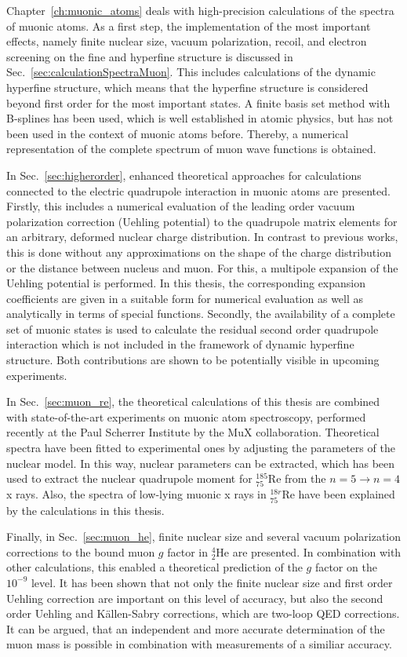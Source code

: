 Chapter~\ref{ch:muonic_atoms} deals with high-precision calculations of the spectra of muonic atoms. 
As a first step, the implementation of the most important effects, namely finite nuclear size, vacuum polarization, recoil, and electron screening on the fine and hyperfine structure is discussed in Sec.~\ref{sec:calculationSpectraMuon}.
This includes calculations of the dynamic hyperfine structure, which means that the hyperfine structure is considered beyond first order for the most important states.
A finite basis set method with B-splines has been used, which is well established in atomic physics, but has not been used in the context of muonic atoms before. Thereby, a numerical representation of the complete spectrum of muon wave functions is obtained.

In Sec.~\ref{sec:higherorder}, enhanced theoretical approaches for calculations connected to the electric quadrupole interaction in muonic atoms are presented. 
Firstly, this includes a numerical evaluation of the leading order vacuum polarization correction (Uehling potential) to the quadrupole matrix elements for an arbitrary, deformed nuclear charge distribution. In contrast to previous works, this is done without any approximations on the shape of the charge distribution or the distance between nucleus and muon. For this, a multipole expansion of the Uehling potential is performed. In this thesis, the corresponding expansion coefficients are given in a suitable form for numerical evaluation as well as analytically in terms of special functions.
Secondly, the availability of a complete set of muonic states is used to calculate the residual second order quadrupole interaction which is not included in the framework of dynamic hyperfine structure. 
Both contributions are shown to be potentially visible in upcoming experiments.

In Sec.~\ref{sec:muon_re}, the theoretical calculations of this thesis are combined with state-of-the-art experiments on muonic atom spectroscopy, performed recently at the Paul Scherrer Institute by the MuX collaboration. Theoretical spectra have been fitted to experimental ones by adjusting the parameters of the nuclear model. In this way, nuclear parameters can be extracted, which has been used to extract the nuclear quadrupole moment for $_{75}^{185}$Re from the ${n}{=}{5}\rightarrow {n}{=}{4}$ x rays. Also, the spectra of low-lying muonic x rays in $_{75}^{18r}$Re have been explained by the calculations in this thesis.

Finally, in Sec.~\ref{sec:muon_he}, finite nuclear size and several vacuum polarization corrections to the bound muon $g$ factor in $_2^4$He are presented. In combination with other calculations, this enabled a theoretical prediction of the $g$ factor on the $10^{-9}$ level. It has been shown that not only the finite nuclear size and first order Uehling correction are important on this level of accuracy, but also the second order Uehling and Källen-Sabry corrections, which are two-loop QED corrections.
It can be argued, that an independent and more accurate determination of the muon mass is possible in combination with measurements of a similiar accuracy.\\[0.3cm]

